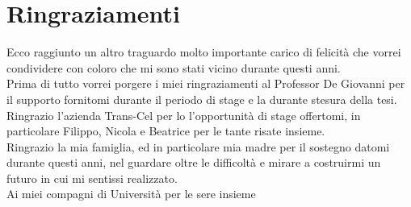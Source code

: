 
\section*{Ringraziamenti}

Ecco raggiunto un altro traguardo molto importante carico di felicità che vorrei condividere con coloro che mi sono stati vicino durante questi anni.\\
\newline
Prima di tutto vorrei porgere i miei ringraziamenti al Professor De Giovanni per il supporto fornitomi durante il periodo di stage e la durante stesura della tesi.\\
Ringrazio l'azienda Trans-Cel per lo l'opportunità di stage offertomi, in particolare Filippo, Nicola e Beatrice per le tante risate insieme.\\
Ringrazio la mia famiglia, ed in particolare mia madre per il sostegno datomi durante questi anni, nel guardare oltre le difficoltà e mirare a costruirmi un futuro in cui mi sentissi realizzato.\\
Ai miei compagni di Università per le sere insieme 
